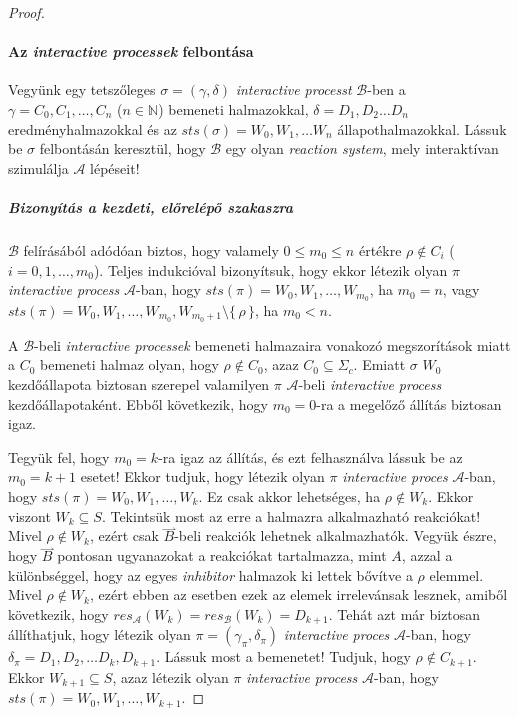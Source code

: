 \documentclass[12pt]{article}
\theoremstyle{definition}
\theoremstyle{remark}
\theoremstyle{plain}
\theoremstyle{remark}
\theoremstyle{plain}
\newcommand{\forwardhat}{\overset{\rightharpoonup}}
\newcommand{\res}{\textit{res}}
\begin{document}
\begin{proof}
        \paragraph{Az \textit{interactive processek} felbontása}
        Vegyünk egy tetszőleges $\sigma = (\gamma, \delta)$ \textit{interactive processt} $\mathscr{B}$-ben a $\gamma = C_{0}, C_{1}, \ldots, C_{n}$ ($n \in \mathbb{N}$) bemeneti halmazokkal, $\delta = D_{1}, D_{2} \ldots D_{n}$ eredményhalmazokkal és az $\textit{sts}(\sigma) = W_{0},W_{1},\ldots W_{n}$ állapothalmazokkal. Lássuk be $\sigma$ felbontásán keresztül, hogy $\mathscr{B}$ egy olyan \textit{reaction system}, mely interaktívan szimulálja $\mathscr{A}$ lépéseit!

        \subparagraph{Bizonyítás a kezdeti, előrelépő szakaszra}
        $\mathscr{B}$ felírásából adódóan biztos, hogy valamely $0 \leq m_{0} \leq n$ értékre $\rho \notin C_{i}$ ($i = 0, 1, \ldots, m_{0}$). Teljes indukcióval bizonyítsuk, hogy ekkor létezik olyan $\pi$ \textit{interactive process} $\mathscr{A}$-ban, hogy $\textit{sts}(\pi) = W_{0}, W_{1}, \ldots, W_{m_{0}}$, ha $m_{0} = n$, vagy $\textit{sts}(\pi) = W_{0}, W_{1}, \ldots, W_{m_{0}}, W_{m_{0} + 1} \setminus \{ \,\rho\,\}$, ha $m_{0} < n$.
        
        A $\mathscr{B}$-beli \textit{interactive processek} bemeneti halmazaira vonakozó megszorítások miatt a $C_{0}$ bemeneti halmaz olyan, hogy $\rho \notin C_{0}$, azaz $C_{0} \subseteq \Sigma_{c}$. Emiatt $\sigma$ $W_{0}$ kezdőállapota biztosan szerepel valamilyen $\pi$ $\mathscr{A}$-beli \textit{interactive process} kezdőállapotaként. Ebből következik, hogy $m_{0} = 0$-ra a megelőző állítás biztosan igaz.
        
        Tegyük fel, hogy $m_{0} = k$-ra igaz az állítás, és ezt felhasználva lássuk be az $m_{0} = k + 1$ esetet! Ekkor tudjuk, hogy létezik olyan $\pi$ \textit{interactive proces} $\mathscr{A}$-ban, hogy $\textit{sts}(\pi) = W_{0}, W_{1}, \ldots, W_{k}$. Ez csak akkor lehetséges, ha $\rho \notin W_{k}$. Ekkor viszont $W_{k} \subseteq S$. Tekintsük most az erre a halmazra alkalmazható reakciókat! Mivel $\rho \notin W_{k}$, ezért csak $\forwardhat B$-beli reakciók lehetnek alkalmazhatók. Vegyük észre, hogy $\forwardhat B$ pontosan ugyanazokat a reakciókat tartalmazza, mint $A$, azzal a különbséggel, hogy az egyes \textit{inhibitor} halmazok ki lettek bővítve a $\rho$ elemmel. Mivel $\rho \notin W_{k}$, ezért ebben az esetben ezek az elemek irrelevánsak lesznek, amiből következik, hogy $\res_{\mathscr{A}}(W_{k}) = \res_{\mathscr{B}}(W_{k}) = D_{k + 1}$. Tehát azt már biztosan állíthatjuk, hogy létezik olyan $\pi = (\gamma_{\pi}, \delta_{\pi})$ \textit{interactive proces} $\mathscr{A}$-ban, hogy $\delta_{\pi} = D_{1}, D_{2}, \ldots D_{k}, D_{k + 1}$. Lássuk most a bemenetet! Tudjuk, hogy $\rho \notin C_{k + 1}$. Ekkor $W_{k + 1} \subseteq S$, azaz létezik olyan $\pi$ \textit{interactive process} $\mathscr{A}$-ban, hogy $\textit{sts}(\pi)=W_{0}, W_{1}, \ldots, W_{k + 1}$.


\end{proof}
\end{document}
